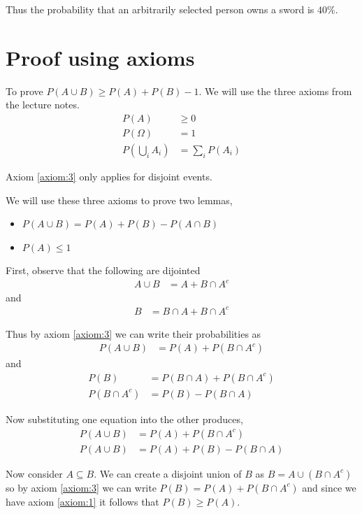 \documentclass{article}
\begin{document}
Thus the probability that an arbitrarily selected person owns a sword is
$40\%$.

\section{Proof using axioms}
To prove $P(A \cup B) \geq P(A) + P(B) - 1$. We will use the three axioms from
the lecture notes.
\begin{align}
    P(A) &\geq 0 \label{axiom:1} \\
    P(\Omega) &= 1 \label{axiom:2} \\
    P(\bigcup_i A_i) &= \sum_i P(A_i) \label{axiom:3}
\end{align}

Axiom \eqref{axiom:3} only applies for disjoint events.

We will use these three axioms to prove two lemmas,
\begin{itemize}
    \item $P(A \cup B) = P(A) + P(B) - P(A \cap B)$
    \item $P(A) \leq 1$
\end{itemize}

First, observe that the following are dijointed
\begin{align*}
    A \cup B &= A + B \cap A^c
\end{align*}
and
\begin{align*}
    B &= B \cap A + B \cap A^c
\end{align*}

Thus by axiom \eqref{axiom:3} we can write their probabilities as
\begin{align*}
    P(A \cup B) &= P(A) + P(B \cap A^c)
\end{align*}
and
\begin{align*}
    P(B) &= P(B \cap A) + P(B \cap A^c) \\
    P(B \cap A^c) &= P(B) - P(B \cap A)
\end{align*}

Now substituting one equation into the
other produces,
\begin{align*}
    P(A \cup B) &= P(A) + P(B \cap A^c) \\
    P(A \cup B) &= P(A) + P(B) - P(B \cap A)
\end{align*}

Now consider $A \subseteq B$. We can create a disjoint union of $B$ as
$B = A \cup (B \cap A^c)$ so by axiom \eqref{axiom:3} we can write
$P(B) = P(A) + P(B \cap A^c)$ and since we have axiom \eqref{axiom:1} it
follows that $P(B) \geq P(A)$.
\end{document}

